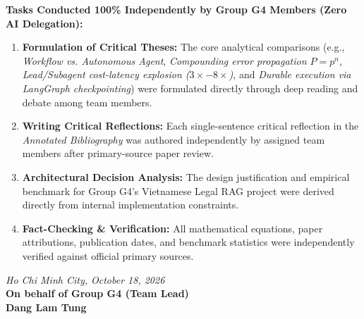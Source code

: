 \documentclass[11pt,a4paper]{article}
\begin{document}
\vspace{0.3cm}
\noindent \textbf{\large Tasks Conducted 100\% Independently by Group G4 Members (Zero AI Delegation):}
\begin{enumerate}
  \item \textbf{Formulation of Critical Theses:} The core analytical comparisons (e.g., \textit{Workflow vs. Autonomous Agent}, \textit{Compounding error propagation $P=p^n$}, \textit{Lead/Subagent cost-latency explosion ($3\times-8\times$)}, and \textit{Durable execution via LangGraph checkpointing}) were formulated directly through deep reading and debate among team members.
  \item \textbf{Writing Critical Reflections:} Each single-sentence critical reflection in the \textit{Annotated Bibliography} was authored independently by assigned team members after primary-source paper review.
  \item \textbf{Architectural Decision Analysis:} The design justification and empirical benchmark for Group G4's Vietnamese Legal RAG project were derived directly from internal implementation constraints.
  \item \textbf{Fact-Checking \& Verification:} All mathematical equations, paper attributions, publication dates, and benchmark statistics were independently verified against official primary sources.
\end{enumerate}

\vspace{0.8cm}
\begin{flushright}
  \textit{Ho Chi Minh City, October 18, 2026}\\[0.2cm]
  \textbf{On behalf of Group G4 (Team Lead)}\\[1.5cm]
  \textbf{Dang Lam Tung}
\end{flushright}
\end{document}
